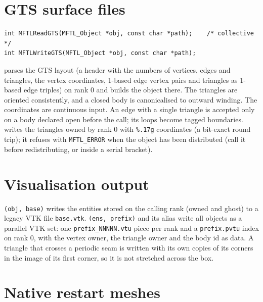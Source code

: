 \section{GTS surface files}

\begin{lstlisting}[numbers=none]
int MFTLReadGTS(MFTL_Object *obj, const char *path);    /* collective */
int MFTLWriteGTS(MFTL_Object *obj, const char *path);
\end{lstlisting}
 parses the \mftlone{} GTS layout (a header with the numbers of vertices, edges
and triangles, the vertex coordinates, 1-based edge vertex pairs and triangles as 1-based edge
triples) on rank 0 and builds the object there. The triangles are oriented consistently, and a
closed body is canonicalised to outward winding. The coordinates are continuous input. An edge
with a single triangle is accepted only on a body declared open before the call; its loops
become tagged boundaries.  writes the triangles owned by rank 0 with
\texttt{\%.17g} coordinates (a bit-exact round trip); it refuses with \texttt{MFTL\_ERROR} when the
object has been distributed (call it before redistributing, or inside a serial bracket).

\section{Visualisation output}

\texttt{(obj, base)} writes the entities stored on the calling rank (owned and
ghost) to a legacy VTK file \texttt{base.vtk}. \texttt{(ens, prefix)} and its
alias  write all objects as a parallel VTK set: one \texttt{prefix\_NNNNN.vtu}
piece per rank and a \texttt{prefix.pvtu} index on rank 0, with the vertex owner, the triangle
owner and the body id as data. A triangle that crosses a periodic seam is written with its own
copies of its corners in the image of its first corner, so it is not stretched across the box.

\section{Native restart meshes}

